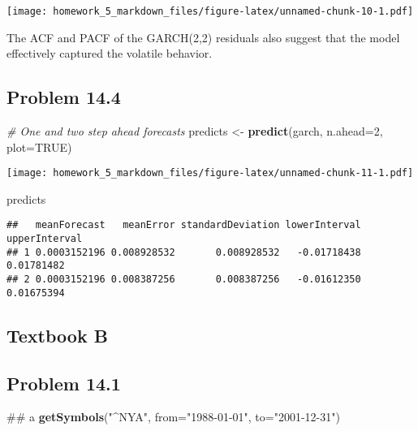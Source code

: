 \documentclass[]{article}
\newenvironment{Shaded}{\begin{snugshade}}{\end{snugshade}}
\newcommand{\KeywordTok}[1]{\textcolor[rgb]{0.13,0.29,0.53}{\textbf{#1}}}
\newcommand{\DataTypeTok}[1]{\textcolor[rgb]{0.13,0.29,0.53}{#1}}
\newcommand{\DecValTok}[1]{\textcolor[rgb]{0.00,0.00,0.81}{#1}}
\newcommand{\StringTok}[1]{\textcolor[rgb]{0.31,0.60,0.02}{#1}}
\newcommand{\CommentTok}[1]{\textcolor[rgb]{0.56,0.35,0.01}{\textit{#1}}}
\newcommand{\OtherTok}[1]{\textcolor[rgb]{0.56,0.35,0.01}{#1}}
\newcommand{\NormalTok}[1]{#1}
\begin{document}
\texttt{[image: homework\_5\_markdown\_files/figure-latex/unnamed-chunk-10-1.pdf]}

The ACF and PACF of the GARCH(2,2) residuals also suggest that the model
effectively captured the volatile behavior.

\subsection{Problem 14.4}\label{problem-14.4}

\begin{Shaded}
\begin{Highlighting}[]
\CommentTok{# One and two step ahead forecasts}
\NormalTok{predicts <-}\StringTok{ }\KeywordTok{predict}\NormalTok{(garch, }\DataTypeTok{n.ahead=}\DecValTok{2}\NormalTok{, }\DataTypeTok{plot=}\OtherTok{TRUE}\NormalTok{)}
\end{Highlighting}
\end{Shaded}

\texttt{[image: homework\_5\_markdown\_files/figure-latex/unnamed-chunk-11-1.pdf]}

\begin{Shaded}
\begin{Highlighting}[]
\NormalTok{predicts}
\end{Highlighting}
\end{Shaded}

\begin{verbatim}
##   meanForecast   meanError standardDeviation lowerInterval upperInterval
## 1 0.0003152196 0.008928532       0.008928532   -0.01718438    0.01781482
## 2 0.0003152196 0.008387256       0.008387256   -0.01612350    0.01675394
\end{verbatim}

\subsection{Textbook B}\label{textbook-b}

\subsection{Problem 14.1}\label{problem-14.1}

\begin{Shaded}
\begin{Highlighting}[]
\NormalTok{## a}
\KeywordTok{getSymbols}\NormalTok{(}\StringTok{"^NYA"}\NormalTok{, }\DataTypeTok{from=}\StringTok{"1988-01-01"}\NormalTok{, }\DataTypeTok{to=}\StringTok{"2001-12-31"}\NormalTok{)}
\end{Highlighting}
\end{Shaded}
\end{document}
